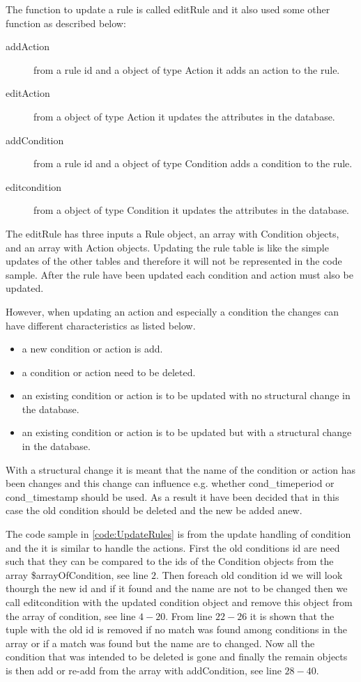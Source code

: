 The function to update a rule is called editRule and it also used some other function as described below:

\begin{description}
	\item[addAction] from a rule id and a object of type Action it adds an action to the rule.
	\item[editAction] from a object of type Action it updates the attributes in the database.   
	\item[addCondition] from a rule id and a object of type Condition adds a condition to the rule.
	\item[editcondition] from a object of type Condition it updates the attributes in the database.   
\end{description}

The editRule has three inputs a Rule object, an array with Condition objects, and an array with Action objects. Updating the rule table is like the simple updates of the other tables and therefore it will not be represented in the code sample. After the rule have been updated each condition and action must also be updated. 

However, when updating an action and especially a condition the changes can have different characteristics as listed below.

\begin{itemize}
	\item a new condition or action is add.
	\item a condition or action need to be deleted.
	\item an existing condition or action is to be updated with no structural change in the database.
	\item an existing condition or action is to be updated but with a structural change in the database.
\end{itemize}

With a structural change it is meant that the name of the condition or action has been changes and this change can influence e.g. whether cond\_timeperiod or cond\_timestamp should be used. As a result it have been decided that in this case the old condition should be deleted and the new be added anew. 

The code sample in \ref{code:UpdateRules} is from the update handling of condition and the it is similar to handle the actions. First the old conditions id are need such that they can be compared to the ids of the Condition objects from the array \$arrayOfCondition, see line $2$. 
Then foreach old condition id we will look thourgh the new id and if it found and the name are not to be changed then we call editcondition with the updated condition object and remove this object from the array of condition, see line $4-20$. 
From line $22-26$ it is shown that the tuple with the old id is removed if no match was found among conditions in the array or if a match was found but the name are to changed. Now all the condition that was intended to be deleted is gone and finally the remain objects is then add or re-add from the array with addCondition, see line $28-40$.


